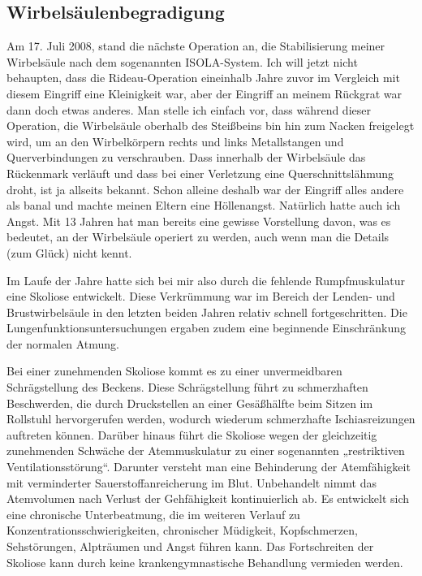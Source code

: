 \documentclass[fontsize=14pt,a4paper,headinclude,DIV=calc,automark]{scrbook}
\begin{document}
\subsection{Wirbelsäulenbegradigung}
\label{sec:wirbelsaeulenversteifung}
Am 17. Juli 2008, stand die nächste Operation an, die Stabilisierung meiner Wirbelsäule nach dem sogenannten ISOLA-System. Ich will jetzt nicht behaupten, dass die Rideau-Operation eineinhalb Jahre zuvor im Vergleich mit diesem Eingriff eine Kleinigkeit war, aber der Eingriff an meinem Rückgrat war dann doch etwas anderes. Man stelle ich einfach vor, dass während dieser Operation, die Wirbelsäule oberhalb des Steißbeins bin hin zum Nacken freigelegt wird, um an den Wirbelkörpern rechts und links Metallstangen und Querverbindungen zu verschrauben. Dass innerhalb der Wirbelsäule das Rückenmark verläuft und dass bei einer Verletzung eine Querschnittslähmung droht, ist ja allseits bekannt. Schon alleine deshalb war der Eingriff alles andere als banal und machte meinen Eltern eine Höllenangst. Natürlich hatte auch ich Angst. Mit 13 Jahren hat man bereits eine gewisse Vorstellung davon, was es bedeutet, an der Wirbelsäule operiert zu werden, auch wenn man die Details (zum Glück) nicht kennt.

Im Laufe der Jahre hatte sich bei mir also durch die fehlende Rumpfmuskulatur eine Skoliose entwickelt. Diese Verkrümmung war im Bereich der Lenden- und Brustwirbelsäule in den letzten beiden Jahren relativ schnell fortgeschritten. Die Lungenfunktionsuntersuchungen ergaben zudem eine beginnende Einschränkung der normalen Atmung.

Bei einer zunehmenden Skoliose kommt es zu einer unvermeidbaren Schrägstellung des Beckens. Diese Schrägstellung führt zu schmerzhaften Beschwerden, die durch Druckstellen an einer Gesäßhälfte beim Sitzen im Rollstuhl hervorgerufen werden, wodurch wiederum schmerzhafte Ischiasreizungen auftreten können. Darüber hinaus führt die Skoliose wegen der gleichzeitig zunehmenden Schwäche der Atemmuskulatur zu einer sogenannten „restriktiven Ventilationsstörung“. Darunter versteht man eine Behinderung der Atemfähigkeit mit verminderter Sauerstoffanreicherung im Blut. Unbehandelt nimmt das Atemvolumen nach Verlust der Gehfähigkeit kontinuierlich ab. Es entwickelt sich eine chronische Unterbeatmung, die im weiteren Verlauf zu Konzentrationsschwierigkeiten, chronischer Müdigkeit, Kopfschmerzen, Sehstörungen, Alpträumen und Angst führen kann. Das Fortschreiten der Skoliose kann durch keine krankengymnastische Behandlung vermieden werden.
\end{document}
